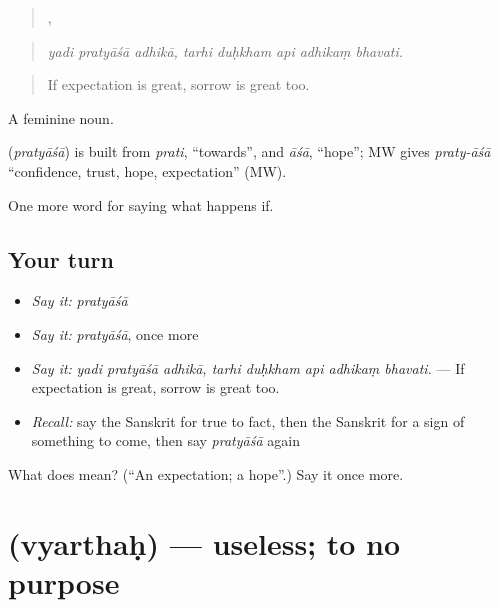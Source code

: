 \begin{quote}
  ,     
\end{quote}

\begin{quote}
\emph{yadi pratyāśā adhikā, tarhi duḥkham api adhikaṃ bhavati.}
\end{quote}

\begin{quote}
If expectation is great, sorrow is great too.
\end{quote}

A feminine noun.

\begin{cousinweb}
\textbf{} (\emph{pratyāśā}) is built from \emph{prati}, \textquotedblleft{}towards\textquotedblright{}, and \emph{āśā}, \textquotedblleft{}hope\textquotedblright{}; MW gives \emph{praty-āśā} \textquotedblleft{}confidence, trust, hope, expectation\textquotedblright{} (MW).
\end{cousinweb}

\begin{grammarlens}[title={What you've built}]
One more word for saying what happens if.
\end{grammarlens}

\subsection*{Your turn}
\begin{itemize}
\raggedright
  \item \emph{Say it:} \emph{pratyāśā}
  \item \emph{Say it:} \emph{pratyāśā}, once more
  \item \emph{Say it:} \emph{yadi pratyāśā adhikā, tarhi duḥkham api adhikaṃ bhavati.} — If expectation is great, sorrow is great too.
  \item \emph{Recall:} say the Sanskrit for true to fact, then the Sanskrit for a sign of something to come, then say \emph{pratyāśā} again
\end{itemize}

\begin{tcolorbox}[breakable,colback=teal!4,colframe=teal!35!black,title={Before you move on}]
What does  mean? (\textquotedblleft{}An expectation; a hope\textquotedblright{}.) Say it once more.
\end{tcolorbox}
\section[\texorpdfstring{\sk{व्यर्थः} (vyarthaḥ)}{व्यर्थः (vyarthaḥ)}]{ (vyarthaḥ) — useless; to no purpose}


